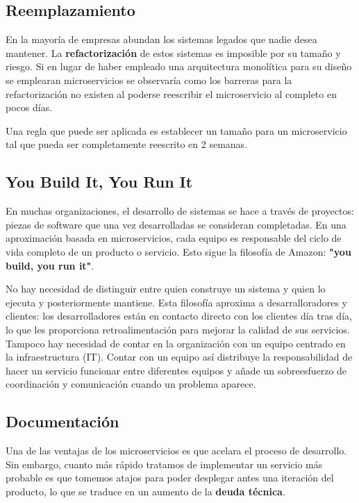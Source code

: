 \documentclass[11pt,spanish,listoffigures]{tfgetsinf}
\begin{document}
\subsection{Reemplazamiento}


En la mayoría de empresas abundan los sistemas legados que nadie desea mantener. La \textbf{refactorización} de estos sistemas es imposible por su tamaño y riesgo. Si en lugar de haber empleado una arquitectura monolítica para su diseño se emplearan microservicios se observaría como los barreras para la refactorización no existen al poderse reescribir el microservicio al completo en pocos días.

Una regla que puede ser aplicada es establecer un tamaño para un microservicio tal que pueda ser completamente reescrito en 2 semanas. \cite{Newman2015a}

\subsection{You Build It, You Run It}

En muchas organizaciones, el desarrollo de sistemas se hace a través de proyectos: piezas de software que una vez desarrolladas se consideran completadas. En una aproximación basada en microservicios, cada equipo es responsable del ciclo de vida completo de un producto o servicio. Esto sigue la filosofía de Amazon: \textbf{"you build, you run it"}. \cite{Lewis2014}

No hay necesidad de distinguir entre quien construye un sistema y quien lo ejecuta y posteriormente mantiene. Esta filosofía aproxima a desarralloradores y clientes: los desarrolladores están en contacto directo con los clientes día tras día, lo que les proporciona retroalimentación para mejorar la calidad de sus servicios. Tampoco hay necesidad de contar en la organización con un equipo centrado en la infraestructura (IT). Contar con un equipo así distribuye la responsabilidad de hacer un servicio funcionar entre diferentes equipos y añade un sobreesfuerzo de coordinación y comunicación cuando un problema aparece. \cite{Vliet2011}

\subsection{Documentación}

Una de las ventajas de los microservicios es que acelara el proceso de desarrollo. Sin embargo, cuanto más rápido tratamos de implementar un servicio más probable es que tomemos atajos para poder desplegar antes una iteración del producto, lo que se traduce en un aumento de la \textbf{deuda técnica}. \cite{FowlerSusan}
\end{document}
